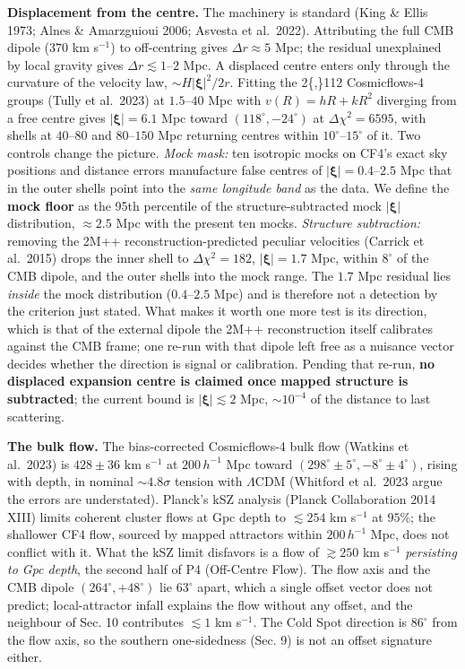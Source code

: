 \documentclass[
  11pt,
]{article}
\begin{document}
\textbf{Displacement from the centre.} The machinery is standard (King
\& Ellis 1973; Alnes \& Amarzguioui 2006; Asvesta et al.~2022).
Attributing the full CMB dipole (\(370\) km s\(^{-1}\)) to off-centring
gives \(\Delta r \approx 5\) Mpc; the residual unexplained by local
gravity gives \(\Delta r \lesssim 1\)--\(2\) Mpc. A displaced centre
enters only through the curvature of the velocity law,
\(\sim H|\boldsymbol{\xi}|^2/2r\). Fitting the 2\{,\}112 Cosmicflows-4
groups (Tully et al.~2023) at \(1.5\)--\(40\) Mpc with
\(v(R) = hR + kR^2\) diverging from a free centre gives
\(|\boldsymbol{\xi}| = 6.1\) Mpc toward \((118^\circ, -24^\circ)\) at
\(\Delta\chi^2 = 6595\), with shells at \(40\)--\(80\) and
\(80\)--\(150\) Mpc returning centres within \(10^\circ\)--\(15^\circ\)
of it. Two controls change the picture. \emph{Mock mask:} ten isotropic
mocks on CF4's exact sky positions and distance errors manufacture false
centres of \(|\boldsymbol{\xi}| = 0.4\)--\(2.5\) Mpc that in the outer
shells point into the \emph{same longitude band} as the data. We define
the \textbf{mock floor} as the 95th percentile of the
structure-subtracted mock \(|\boldsymbol{\xi}|\) distribution,
\(\approx 2.5\) Mpc with the present ten mocks. \emph{Structure
subtraction:} removing the 2M++ reconstruction-predicted peculiar
velocities (Carrick et al.~2015) drops the inner shell to
\(\Delta\chi^2 = 182\), \(|\boldsymbol{\xi}| = 1.7\) Mpc, within
\(8^\circ\) of the CMB dipole, and the outer shells into the mock range.
The \(1.7\) Mpc residual lies \emph{inside} the mock distribution
(\(0.4\)--\(2.5\) Mpc) and is therefore not a detection by the criterion
just stated. What makes it worth one more test is its direction, which
is that of the external dipole the 2M++ reconstruction itself calibrates
against the CMB frame; one re-run with that dipole left free as a
nuisance vector decides whether the direction is signal or calibration.
Pending that re-run, \textbf{no displaced expansion centre is claimed
once mapped structure is subtracted}; the current bound is
\(|\boldsymbol{\xi}| \lesssim 2\) Mpc, \(\sim\!10^{-4}\) of the distance
to last scattering.

\textbf{The bulk flow.} The bias-corrected Cosmicflows-4 bulk flow
(Watkins et al.~2023) is \(428 \pm 36\) km s\(^{-1}\) at \(200\,h^{-1}\)
Mpc toward \((298^\circ \pm 5^\circ, -8^\circ \pm 4^\circ)\), rising
with depth, in nominal \(\sim\!4.8\sigma\) tension with \(\Lambda\)CDM
(Whitford et al.~2023 argue the errors are understated). Planck's kSZ
analysis (Planck Collaboration 2014 XIII) limits coherent cluster flows
at Gpc depth to \(\lesssim 254\) km s\(^{-1}\) at \(95\%\); the
shallower CF4 flow, sourced by mapped attractors within \(200\,h^{-1}\)
Mpc, does not conflict with it. What the kSZ limit disfavors is a flow
of \(\gtrsim 250\) km s\(^{-1}\) \emph{persisting to Gpc depth}, the
second half of P4 (Off-Centre Flow). The flow axis and the CMB dipole
\((264^\circ, +48^\circ)\) lie \(63^\circ\) apart, which a single offset
vector does not predict; local-attractor infall explains the flow
without any offset, and the neighbour of Sec. 10 contributes
\(\lesssim 1\) km s\(^{-1}\). The Cold Spot direction is \(86^\circ\)
from the flow axis, so the southern one-sidedness (Sec. 9) is not an
offset signature either.
\end{document}
